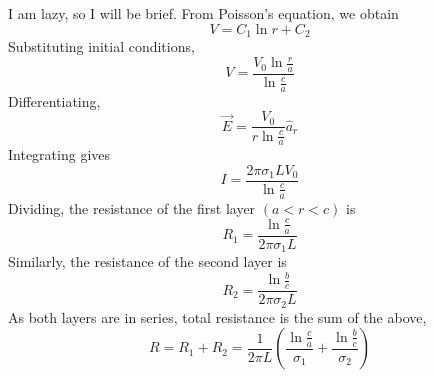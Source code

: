 \documentclass[answers]{exam}
\begin{document}
\begin{questions}
\begin{solution}
	I am lazy, so I will be brief. From Poisson's equation, we obtain
	$$V = C_1\ln r + C_2$$
	Substituting initial conditions,
	$$V = \frac{V_0\ln\frac{r}{a}}{\ln\frac{c}{a}}$$
	Differentiating,
	$$\vec E = \frac{V_0}{r\ln\frac{c}{a}} \hat a_r$$
	Integrating gives
	$$I = \frac{2\pi\sigma_1LV_0}{\ln\frac{c}{a}}$$
	Dividing, the resistance of the first layer $(a<r<c)$ is
	$$R_1 = \frac{\ln\frac{c}{a}}{2\pi\sigma_1L}$$
	Similarly, the resistance of the second layer is
	$$R_2 = \frac{\ln\frac{b}{c}}{2\pi\sigma_2L}$$
	As both layers are in series, total resistance is the sum of the above,
	$$R = R_1 + R_2 = \frac{1}{2\pi L}\left(\frac{\ln\frac{c}{a}}{\sigma_1} + \frac{\ln\frac{b}{c}}{\sigma_2}\right)$$
\end{solution}
\end{questions}
\end{document}
